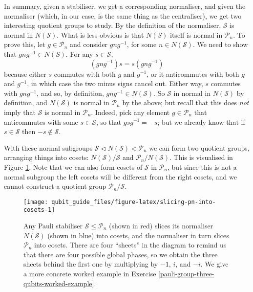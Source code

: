 \documentclass[fleqn]{article}
\begin{document}
In summary, given a stabiliser, we get a corresponding normaliser, and given the normaliser (which, in our case, is the same thing as the centraliser), we get two interesting quotient groups to study.
By the definition of the normaliser, \(\mathcal{S}\) is normal in \(N(\mathcal{S})\).
What is less obvious is that \(N(S)\) itself is normal in \(\mathcal{P}_n\).
To prove this, let \(g\in\mathcal{P}_n\) and consider \(gng^{-1}\), for some \(n\in N(\mathcal{S})\).
We need to show that \(gng^{-1}\in N(S)\).
For any \(s\in\mathcal{S}\),
\[
  (gng^{-1})s = s(gng^{-1})
\]
because either \(s\) commutes with both \(g\) and \(g^{-1}\), or it anticommutes with both \(g\) and \(g^{-1}\), in which case the two minus signs cancel out.
Either way, \(s\) commutes with \(gng^{-1}\), and so, by definition, \(gng^{-1}\in N(\mathcal{S})\).
So \(\mathcal{S}\) in normal in \(N(\mathcal{S})\) by definition, and \(N(\mathcal{S})\) is normal in \(\mathcal{P}_n\) by the above; but recall that this does \emph{not} imply that \(\mathcal{S}\) is normal in \(\mathcal{P}_n\).
Indeed, pick any element \(g\in\mathcal{P}_n\) that anticommutes with some \(s\in\mathcal{S}\), so that \(gsg^{-1}=-s\); but we already know that if \(s\in\mathcal{S}\) then \(-s\not\in\mathcal{S}\).

With these normal subgroups \(\mathcal{S}\triangleleft N(\mathcal{S})\triangleleft\mathcal{P}_n\) we can form two quotient groups, arranging things into cosets: \(N(\mathcal{S})/\mathcal{S}\) and \(\mathcal{P}_n/N(\mathcal{S})\).
This is visualised in Figure \ref{fig:slicing-pn-into-cosets}.
Note that we can also form cosets of \(\mathcal{S}\) in \(\mathcal{P}_n\), but since this is not a normal subgroup the left cosets will be different from the right cosets, and we cannot construct a quotient group \(\mathcal{P}_n/\mathcal{S}\).



\begin{figure}[H]

{\centering \texttt{[image: qubit\_guide\_files/figure-latex/slicing-pn-into-cosets-1]} 

}

\caption{Any Pauli stabiliser \(\mathcal{S}\leqslant\mathcal{P}_n\) (shown in red) slices its normaliser \(N(\mathcal{S})\) (shown in blue) into cosets, and the normaliser in turn slices \(\mathcal{P}_n\) into cosets. There are four ``sheets'' in the diagram to remind us that there are four possible global phases, so we obtain the three sheets behind the first one by multiplying by \(-1\), \(i\), and \(-i\). We give a more concrete worked example in Exercise \ref{pauli-group-three-qubits-worked-example}.}\label{fig:slicing-pn-into-cosets}
\end{figure}
\end{document}
